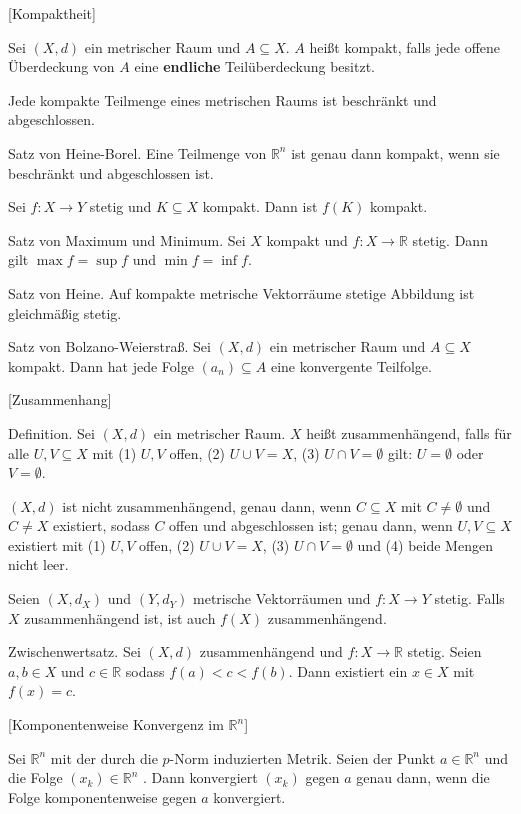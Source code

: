 \documentclass[fleqn,draft,a5paper]{article}
\theoremstyle{remark}
\begin{document}
[Kompaktheit]

Sei \((X, d)\) ein metrischer Raum und \(A \subseteq X\).  \(A\) heißt
kompakt, falls jede offene Überdeckung von \(A\) eine
\textbf{endliche} Teilüberdeckung besitzt.

Jede kompakte Teilmenge eines metrischen Raums ist beschränkt
und abgeschlossen.

Satz von Heine-Borel.  Eine Teilmenge von \(\mathbb{R}^{n}\) ist genau dann
kompakt, wenn sie beschränkt und abgeschlossen ist.

Sei \(f\colon X \to Y\) stetig und \(K \subseteq X\) kompakt.  Dann ist \(f(K)\)
kompakt.

Satz von Maximum und Minimum.  Sei \(X\) kompakt und \(f: X \to \mathbb{R}\)
stetig.  Dann gilt \(\max f = \sup f\) und \(\min f = \inf f\).

Satz von Heine.  Auf kompakte metrische Vektorräume stetige Abbildung
ist gleichmäßig stetig.

Satz von Bolzano-Weierstraß.  Sei \((X, d)\) ein metrischer Raum
und \(A \subseteq X\) kompakt.  Dann hat jede Folge \((a_{n}) \subseteq A\) eine
konvergente Teilfolge.

[Zusammenhang]

Definition.  Sei \((X, d)\) ein metrischer Raum.  \(X\) heißt
zusammenhängend, falls für alle \(U, V \subseteq X\) mit (1) \(U, V\) offen,
(2) \(U \cup V = X\), (3) \(U \cap V = \emptyset\) gilt: \(U = \emptyset\) oder \(V = \emptyset\).

\((X, d)\) ist nicht zusammenhängend, genau dann, wenn
\(C \subseteq X\) mit \(C \ne \emptyset\) und \(C \ne X\) existiert, sodass
\(C\) offen und abgeschlossen ist; genau dann, wenn
\(U, V \subseteq X\) existiert mit (1) \(U, V\) offen, (2)
\(U \cup V = X\), (3) \(U \cap V = \emptyset\) und (4) beide Mengen nicht leer.

Seien \((X, d_{X})\) und \((Y, d_{Y})\) metrische Vektorräumen und
\(f\colon X \to Y\) stetig.  Falls \(X\) zusammenhängend ist, ist auch
\(f(X)\) zusammenhängend.

Zwischenwertsatz.  Sei \((X, d)\) zusammenhängend und \(f: X \to \mathbb{R}\)
stetig.  Seien \(a, b \in X\) und \(c \in \mathbb{R}\) sodass \(f(a) < c < f(b)\).
Dann existiert ein \(x \in X\) mit \(f(x) = c\).

[Komponentenweise Konvergenz im \(\mathbb{R}^{n}\)]

Sei \(\mathbb{R}^{n}\) mit der durch die \(p\)-Norm induzierten Metrik.  Seien der
Punkt \(a \in \mathbb{R}^{n}\) und die Folge
\((x_{k}) \in \mathbb{R}^{n}\) .  Dann konvergiert \((x_{k})\) gegen
\(a\) genau dann, wenn die Folge komponentenweise gegen \(a\) konvergiert.
\end{document}
